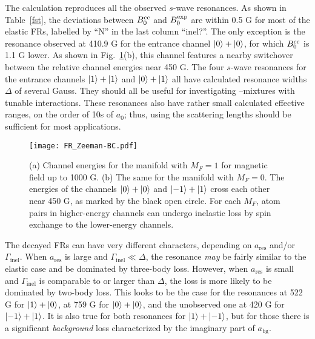 The calculation reproduces all the observed $s$-wave resonances. As shown in Table~\ref{fst}, the deviations between $B_0^{\rm cc}$ and $B_0^{\rm exp}$ are within 0.5 G for most of the elastic FRs, labelled by ``N'' in the last column ``inel?''. The only exception is the resonance observed at 410.9 G for the entrance channel $\ket{0} + \ket{0}$, for which $B_0^{\rm cc}$ is 1.1 G lower. As shown in Fig.~\ref{FR_Zeeman-BC}(b), this channel features a nearby switchover between the relative channel energies near 450 G. The four $s$-wave resonances for the entrance channels $\ket{1}+\ket{1}$ and $\ket{0}+ \ket{1}$ all have calculated resonance widths $\Delta$ of several Gauss. They should all be useful for investigating \Na--\Rb mixtures with tunable interactions. These resonances also have rather small calculated effective ranges, on the order of 10s of $a_0$; thus, using the scattering lengths should be sufficient for most applications.

\begin{figure}[htb]
\begin{center}
\texttt{[image: FR\_Zeeman-BC.pdf]}
\end{center}
\caption[Zeeman energy for $M_F=1$ and $M_F=0$ channels]{(a) Channel energies for the manifold with $M_F = 1$ for magnetic field up to 1000 G. (b) The same for the manifold with $M_F = 0$. The energies of the channels $\ket{0}+\ket{0}$ and $\ket{-1}+\ket{1}$ cross each other near 450 G, as marked by the black open circle. For each $M_F$, atom pairs in higher-energy channels can undergo inelastic loss by spin exchange to the lower-energy channels.}
\label{FR_Zeeman-BC}
\end{figure}

The decayed FRs can have very different characters, depending on $a_\textrm{res}$ and/or $\Gamma_\textrm{inel}$. When $a_\textrm{res}$ is large and $\Gamma_\textrm{inel}\ll\Delta$, the resonance \emph{may} be fairly similar to the elastic case and be dominated by three-body loss. However, when $a_\textrm{res}$ is small and $\Gamma_\textrm{inel}$ is comparable to or larger than $\Delta$, the loss is more likely to be dominated by two-body loss. This looks to be the case for the resonances at 522 G for $\ket{1}+\ket{0}$, at 759 G for $\ket{0}+\ket{0}$, and the unobserved one at 420 G for $\ket{-1}+\ket{1}$. It is also true for both resonances for $\ket{1}+\ket{-1}$, but for those there is a significant \emph{background} loss characterized by the imaginary part of $a_\textrm{bg}$.

